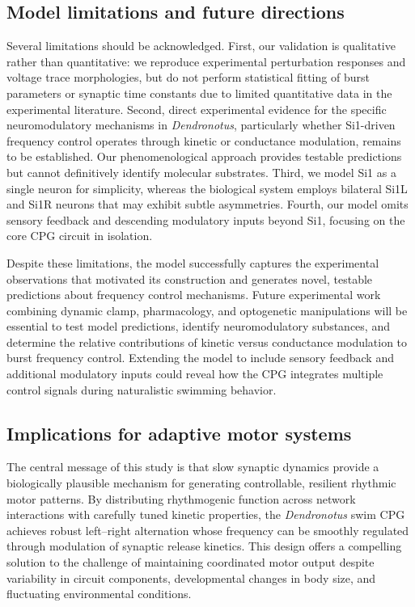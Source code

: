 \documentclass[nofootinbib,aip,amsmath,amssymb,preprint,twocolumn,floatfix,10pt]{revtex4-2}
\begin{document}
\subsection{Model limitations and future directions}

Several limitations should be acknowledged. First, our validation is qualitative rather than quantitative: we reproduce experimental perturbation responses and voltage trace morphologies, but do not perform statistical fitting of burst parameters or synaptic time constants due to limited quantitative data in the experimental literature. Second, direct experimental evidence for the specific neuromodulatory mechanisms in \textit{Dendronotus}, particularly whether Si1-driven frequency control operates through kinetic or conductance modulation, remains to be established. Our phenomenological approach provides testable predictions but cannot definitively identify molecular substrates. Third, we model Si1 as a single neuron for simplicity, whereas the biological system employs bilateral Si1L and Si1R neurons that may exhibit subtle asymmetries. Fourth, our model omits sensory feedback and descending modulatory inputs beyond Si1, focusing on the core CPG circuit in isolation.

Despite these limitations, the model successfully captures the experimental observations that motivated its construction and generates novel, testable predictions about frequency control mechanisms. Future experimental work combining dynamic clamp, pharmacology, and optogenetic manipulations will be essential to test model predictions, identify neuromodulatory substances, and determine the relative contributions of kinetic versus conductance modulation to burst frequency control. Extending the model to include sensory feedback and additional modulatory inputs could reveal how the CPG integrates multiple control signals during naturalistic swimming behavior.

\subsection{Implications for adaptive motor systems}

The central message of this study is that slow synaptic dynamics provide a biologically plausible mechanism for generating controllable, resilient rhythmic motor patterns. By distributing rhythmogenic function across network interactions with carefully tuned kinetic properties, the \textit{Dendronotus} swim CPG achieves robust left--right alternation whose frequency can be smoothly regulated through modulation of synaptic release kinetics. This design offers a compelling solution to the challenge of maintaining coordinated motor output despite variability in circuit components, developmental changes in body size, and fluctuating environmental conditions.
\end{document}
